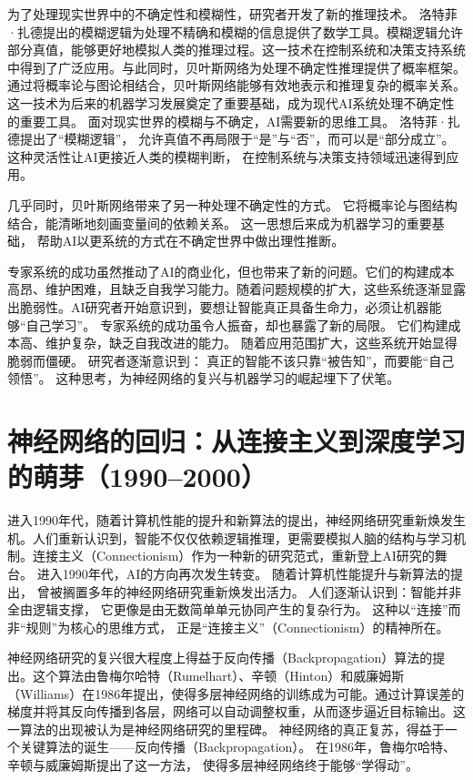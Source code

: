 为了处理现实世界中的不确定性和模糊性，研究者开发了新的推理技术。
洛特菲·扎德提出的模糊逻辑为处理不精确和模糊的信息提供了数学工具。模糊逻辑允许部分真值，能够更好地模拟人类的推理过程。这一技术在控制系统和决策支持系统中得到了广泛应用。与此同时，贝叶斯网络为处理不确定性推理提供了概率框架。通过将概率论与图论相结合，贝叶斯网络能够有效地表示和推理复杂的概率关系。这一技术为后来的机器学习发展奠定了重要基础，成为现代AI系统处理不确定性的重要工具。
面对现实世界的模糊与不确定，AI需要新的思维工具。  
洛特菲·扎德提出了“模糊逻辑”，  
允许真值不再局限于“是”与“否”，而可以是“部分成立”。  
这种灵活性让AI更接近人类的模糊判断，  
在控制系统与决策支持领域迅速得到应用。  

几乎同时，贝叶斯网络带来了另一种处理不确定性的方式。  
它将概率论与图结构结合，能清晰地刻画变量间的依赖关系。  
这一思想后来成为机器学习的重要基础，  
帮助AI以更系统的方式在不确定世界中做出理性推断。  

专家系统的成功虽然推动了AI的商业化，但也带来了新的问题。它们的构建成本高昂、维护困难，且缺乏自我学习能力。随着问题规模的扩大，这些系统逐渐显露出脆弱性。AI研究者开始意识到，要想让智能真正具备生命力，必须让机器能够“自己学习”。
专家系统的成功虽令人振奋，却也暴露了新的局限。  
它们构建成本高、维护复杂，缺乏自我改进的能力。  
随着应用范围扩大，这些系统开始显得脆弱而僵硬。  
研究者逐渐意识到：  
真正的智能不该只靠“被告知”，而要能“自己领悟”。  
这种思考，为神经网络的复兴与机器学习的崛起埋下了伏笔。  

\section{神经网络的回归：从连接主义到深度学习的萌芽（1990–2000）}

进入1990年代，随着计算机性能的提升和新算法的提出，神经网络研究重新焕发生机。人们重新认识到，智能不仅仅依赖逻辑推理，更需要模拟人脑的结构与学习机制。连接主义（Connectionism）作为一种新的研究范式，重新登上AI研究的舞台。
进入1990年代，AI的方向再次发生转变。  
随着计算机性能提升与新算法的提出，  
曾被搁置多年的神经网络研究重新焕发出活力。  
人们逐渐认识到：智能并非全由逻辑支撑，  
它更像是由无数简单单元协同产生的复杂行为。  
这种以“连接”而非“规则”为核心的思维方式，  
正是“连接主义”（Connectionism）的精神所在。  

神经网络研究的复兴很大程度上得益于反向传播（Backpropagation）算法的提出。这个算法由鲁梅尔哈特（Rumelhart）、辛顿（Hinton）和威廉姆斯（Williams）在1986年提出，使得多层神经网络的训练成为可能。通过计算误差的梯度并将其反向传播到各层，网络可以自动调整权重，从而逐步逼近目标输出。这一算法的出现被认为是神经网络研究的里程碑。
神经网络的真正复苏，得益于一个关键算法的诞生——反向传播（Backpropagation）。  
在1986年，鲁梅尔哈特、辛顿与威廉姆斯提出了这一方法，  
使得多层神经网络终于能够“学得动”。  

